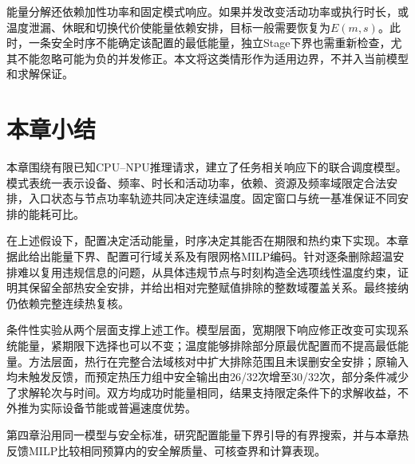 能量分解还依赖加性功率和固定模式响应。如果并发改变活动功率或执行时长，或温度泄漏、休眠和切换代价使能量依赖安排，目标一般需要恢复为$E(m,s)$。此时，一条安全时序不能确定该配置的最低能量，独立Stage下界也需重新检查，尤其不能忽略可能为负的并发修正。本文将这类情形作为适用边界，不并入当前模型和求解保证。

\clearpage
\section{本章小结}

本章围绕有限已知CPU--NPU推理请求，建立了任务相关响应下的联合调度模型。模式表统一表示设备、频率、时长和活动功率，依赖、资源及频率域限定合法安排，入口状态与节点功率轨迹共同决定连续温度。固定窗口与统一基准保证不同安排的能耗可比。

在上述假设下，配置决定活动能量，时序决定其能否在期限和热约束下实现。本章据此给出能量下界、配置可行域关系及有限网格MILP编码。针对逐条删除超温安排难以复用违规信息的问题，从具体违规节点与时刻构造全选项线性温度约束，证明其保留全部热安全安排，并给出相对完整赋值排除的整数域覆盖关系。最终接纳仍依赖完整连续热复核。

条件性实验从两个层面支撑上述工作。模型层面，宽期限下响应修正改变可实现系统能量，紧期限下选择也可以不变；温度能够排除部分原最优配置而不提高最低能量。方法层面，热行在完整合法域核对中扩大排除范围且未误删安全安排；原输入均未触发反馈，而预定热压力组中安全输出由26/32次增至30/32次，部分条件减少了求解轮次与时间。双方均成功时能量相同，结果支持限定条件下的求解收益，不外推为实际设备节能或普遍速度优势。

第四章沿用同一模型与安全标准，研究配置能量下界引导的有界搜索，并与本章热反馈MILP比较相同预算内的安全解质量、可核查界和计算表现。
